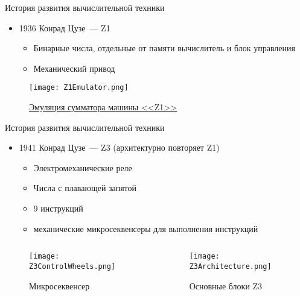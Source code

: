 \documentclass[aspectratio=169,14pt]{beamer}
\begin{document}
\begin{frame}{История развития вычислительной техники}
    \begin{itemize}
        \item 1936 Конрад Цузе~--- Z1
        \begin{itemize}
            \item Бинарные числа, отдельные от памяти вычислитель и блок управления
            \item Механический привод
        \end{itemize}
    \end{itemize}
    \begin{figure}[htp]
        \centering
        \texttt{[image: Z1Emulator.png]}
        \caption{\href{http://zuse-z1.zib.de/simulations/z1/adders/wgl/}{\scriptsize{Эмуляция сумматора машины <<Z1>>}}}
        \label{fig:Z1Emulator}
    \end{figure}
\end{frame}

\begin{frame}{История развития вычислительной техники}
    \begin{itemize}
        \item 1941 Конрад Цузе~--- Z3 (архитектурно повторяет Z1)
        \begin{itemize}
            \item Электромеханические реле
            \item Числа с плавающей запятой
            \item 9 инструкций
            \item механические микросеквенсеры для выполнения инструкций
        \end{itemize}
    \end{itemize}
    \begin{columns}[T,onlytextwidth]
        \begin{column}{0.5\textwidth}
            \begin{figure}[htp]
                \centering
                \texttt{[image: Z3ControlWheels.png]}
                \caption{\tiny{Микросеквенсер}}
                \label{fig:Z3ControlWheels}
            \end{figure}
        \end{column}
        \begin{column}{0.5\textwidth}
            \begin{figure}[htp]
                \centering
                \texttt{[image: Z3Architecture.png]}
                \caption{\tiny{Основные блоки Z3}}
                \label{fig:Z3Architecture}
            \end{figure}
        \end{column}
    \end{columns}
\end{frame}
\end{document}
